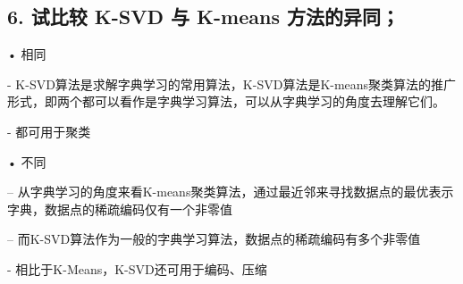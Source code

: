 \documentclass{article}
\begin{document}
\subsection*{6. 试比较 K-SVD 与 K-means 方法的异同；}

• 相同

- K-SVD算法是求解字典学习的常用算法，K-SVD算法是K-means聚类算法的推广形式，即两个都可以看作是字典学习算法，可以从字典学习的角度去理解它们。

- 都可用于聚类

• 不同

– 从字典学习的角度来看K-means聚类算法，通过最近邻来寻找数据点的最优表示字典，数据点的稀疏编码仅有一个非零值

– 而K-SVD算法作为一般的字典学习算法，数据点的稀疏编码有多个非零值

- 相比于K-Means，K-SVD还可用于编码、压缩
\end{document}
